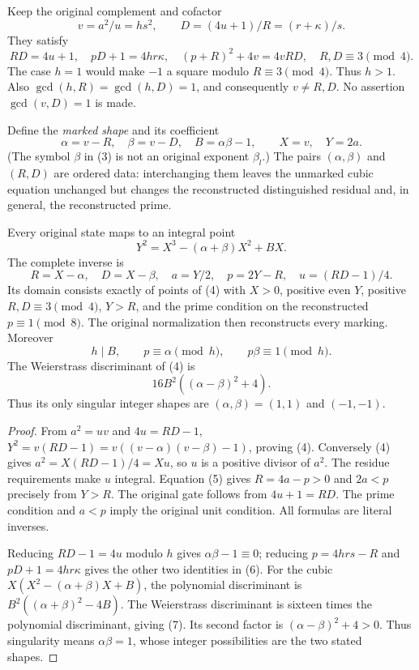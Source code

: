 Keep the original complement and cofactor
\[
 v=a^2/u=hs^2,\qquad D=(4u+1)/R=(r+\kappa)/s.
\]
They satisfy
\[
 RD=4u+1,\quad pD+1=4hr\kappa,\quad
 (p+R)^2+4v=4vRD,\quad R,D\equiv3\pmod4.                 \tag{2}
\]
The case $h=1$ would make $-1$ a square modulo $R\equiv3\pmod4$. Thus $h>1$.
Also $\gcd(h,R)=\gcd(h,D)=1$, and consequently $v\ne R,D$.
No assertion $\gcd(v,D)=1$ is made.

Define the \emph{marked shape} and its coefficient
\[
 \alpha=v-R,\quad \beta=v-D,\quad B=\alpha\beta-1,
 \qquad X=v,\quad Y=2a.                                  \tag{3}
\]
(The symbol $\beta$ in (3) is not an original exponent $\beta_l$.)
The pairs $(\alpha,\beta)$ and $(R,D)$ are ordered data: interchanging them
leaves the unmarked cubic equation unchanged but changes the reconstructed
distinguished residual and, in general, the reconstructed prime.
\begin{theorem}\label{thm:curve}
Every original state maps to an integral point
\[
 \boxed{Y^2=X^3-(\alpha+\beta)X^2+BX.}                    \tag{4}
\]
The complete inverse is
\[
 R=X-\alpha,\quad D=X-\beta,\quad a=Y/2,\quad
 p=2Y-R,\quad u=(RD-1)/4.                                \tag{5}
\]
Its domain consists exactly of points of (4) with $X>0$, positive even $Y$,
positive $R,D\equiv3\pmod4$, $Y>R$, and the prime condition on the reconstructed
$p\equiv1\pmod8$. The original normalization then reconstructs every marking.
Moreover
\[
 \boxed{h\mid B,\qquad p\equiv\alpha\pmod h,\qquad
 p\beta\equiv1\pmod h.}                                 \tag{6}
\]
The Weierstrass discriminant of (4) is
\[
 \boxed{16B^2((\alpha-\beta)^2+4).}                       \tag{7}
\]
Thus its only singular integer shapes are $(\alpha,\beta)=(1,1)$ and $(-1,-1)$.
\end{theorem}
\begin{proof}
From $a^2=uv$ and $4u=RD-1$,
$Y^2=v(RD-1)=v((v-\alpha)(v-\beta)-1)$, proving (4).
Conversely (4) gives $a^2=X(RD-1)/4=Xu$, so $u$ is a positive divisor of $a^2$.
The residue requirements make $u$ integral. Equation (5) gives $R=4a-p>0$ and
$2a<p$ precisely from $Y>R$. The original gate follows from $4u+1=RD$.
The prime condition and $a<p$ imply the original unit condition.
All formulas are literal inverses.

Reducing $RD-1=4u$ modulo $h$ gives $\alpha\beta-1\equiv0$; reducing
$p=4hrs-R$ and $pD+1=4hr\kappa$ gives the other two identities in (6).
For the cubic $X(X^2-(\alpha+\beta)X+B)$, the polynomial discriminant is
$B^2((\alpha+\beta)^2-4B)$. The Weierstrass discriminant is sixteen times
the polynomial discriminant, giving (7).
Its second factor is $(\alpha-\beta)^2+4>0$. Thus singularity means
$\alpha\beta=1$, whose integer possibilities are the two stated shapes.
\end{proof}

